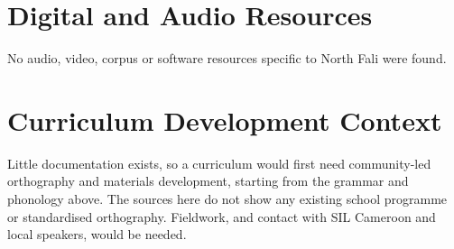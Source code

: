 \documentclass[12pt]{article}
\begin{document}
\section{Digital and Audio Resources}
No audio, video, corpus or software resources specific to North Fali were found.

\section{Curriculum Development Context}
Little documentation exists, so a curriculum would first need community-led orthography and materials development, starting from the grammar and phonology above. The sources here do not show any existing school programme or standardised orthography. Fieldwork, and contact with SIL Cameroon and local speakers, would be needed.
\end{document}
